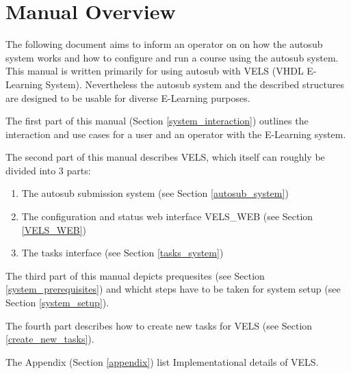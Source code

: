 \section{Manual Overview} \label{overview}

The following document aims to inform an operator on on how the autosub system works
and how to configure and run a course using the autosub system. This manual is written 
primarily for using autosub with VELS (VHDL E-Learning System). Nevertheless the autosub 
system and the described structures are designed to be usable for diverse E-Learning 
purposes.

The first part of this manual (Section \ref{system_interaction}) outlines the 
interaction and use cases for a user and an operator with the E-Learning system.

The second part of this manual describes VELS, which itself can roughly be divided 
into 3 parts:
\begin{enumerate}
    \item The autosub submission system (see Section \ref{autosub_system})
    \item The configuration and status web interface VELS\_WEB (see Section 
	      \ref{VELS_WEB})
    \item The tasks interface (see Section \ref{tasks_system})
\end{enumerate}

The third part of this manual depicts prequesites (see Section \ref{system_prerequisites})
and whicht steps have to be taken for system setup (see Section \ref{system_setup}).

The fourth part describes how to create new tasks for VELS (see Section \ref{create_new_tasks}).

The Appendix (Section \ref{appendix}) list Implementational details of VELS.
